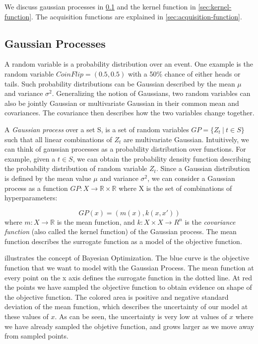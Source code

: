 We discuss gaussian processes in \cref{sec:gp} and the kernel function in \cref{sec:kernel-function}. The acquisition functions are explained in \cref{sec:acquisition-function}.

\subsection{Gaussian Processes}\label{sec:gp}
A random variable is a probability distribution over an event. One example is the random variable $CoinFlip = (0.5, 0.5)$ with a 50\% chance of either heads or tails. Such probability distributions can be Gaussian described by the mean $\mu$ and variance $\sigma^2$. Generalizing the notion of Gaussians, two random variables can also be jointly Gaussian or multivariate Gaussian in their common mean and covariances. The covariance then describes how the two variables change together.

A \emph{Gaussian process} over a set S, is a set of random variables $GP = \{Z_t \ | \ t \in S\}$ such that all linear combinations of $Z_t$ are multivariate Gaussian. Intuitively, we can think of gaussian processes as a probability distribution over functions. For example, given a $t \in S$, we can obtain the probability density function describing the probability distribution of random variable $Z_t$. Since a Gaussian distribution is defined by the mean value $\mu$ and variance $\sigma^2$, we can consider a Gaussian process as a function $GP : X \rightarrow \mathbb{R} \times \mathbb{R}$ where X is the set of combinations of hyperparameters:

\begin{equation}\label{gaussian-process}
GP(x) = (m(x), k(x, x'))
\end{equation}
where $m : X \rightarrow \mathbb{R}$ is the mean function, and $k : X \times X \rightarrow R^n$ is the \emph{covariance function} (also called the kernel function) of the Gaussian process. 
The mean function describes the surrogate function as a model of the objective function.

 illustrates the concept of Bayesian Optimization. The blue curve is the objective function that we want to model with the Gaussian Process. The mean function at every point on the x axis defines the surrogate function in the dotted line. At red the points we have sampled the objective function to obtain evidence on shape of the objective function. The colored area is positive and negative standard deviation of the mean function, which describes the uncertainty of our model at these values of $x$. As can be seen, the uncertainty is very low at values of $x$ where we have already sampled the objetive function, and grows larger as we move away from sampled points.

